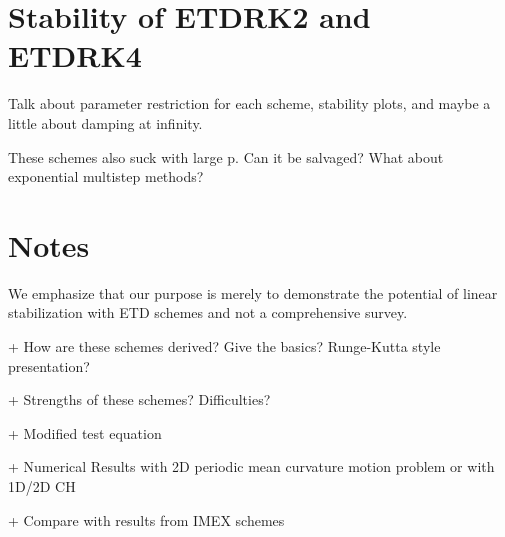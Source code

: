 \section{Stability of ETDRK2 and ETDRK4}
Talk about parameter restriction for each scheme, stability plots, and maybe a little about damping at infinity.

These schemes also suck with large p. Can it be salvaged? What about exponential multistep methods? 

\clearpage
\section{Notes}



We emphasize that our purpose is merely to demonstrate the potential of linear stabilization with ETD schemes and not a comprehensive survey.

+ How are these schemes derived? Give the basics? Runge-Kutta style presentation? 

+ Strengths of these schemes? Difficulties? 

+ Modified test equation

+ Numerical Results with 2D periodic mean curvature motion problem or with 1D/2D CH 

+ Compare with results from IMEX schemes
